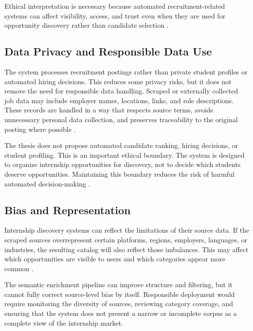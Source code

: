 Ethical interpretation is necessary because automated recruitment-related systems can affect visibility, access, and trust even when they are used for opportunity discovery rather than candidate selection \cite{hunkenschroer2022ethics, rigotti2024fairness}.

\subsection{Data Privacy and Responsible Data Use}

The system processes recruitment postings rather than private student profiles or automated
hiring decisions. This reduces some privacy risks, but it does not remove the need for
responsible data handling. Scraped or externally collected job data may include employer
names, locations, links, and role descriptions. These records are handled in a way that
respects source terms, avoids unnecessary personal data collection, and preserves traceability
to the original posting where possible \cite{hunkenschroer2022ethics, rigotti2024fairness}.

The thesis does not propose automated candidate ranking, hiring decisions, or student
profiling. This is an important ethical boundary. The system is designed to organize
internship opportunities for discovery, not to decide which students deserve opportunities.
Maintaining this boundary reduces the risk of harmful automated decision-making \cite{hunkenschroer2022ethics}.

\subsection{Bias and Representation}

Internship discovery systems can reflect the limitations of their source data. If the scraped
sources overrepresent certain platforms, regions, employers, languages, or industries, the
resulting catalog will also reflect those imbalances. This may affect which opportunities are
visible to users and which categories appear more common \cite{hunkenschroer2022ethics, rigotti2024fairness}.

The semantic enrichment pipeline can improve structure and filtering, but it cannot fully
correct source-level bias by itself. Responsible deployment would require monitoring the
diversity of sources, reviewing category coverage, and ensuring that the system does not
present a narrow or incomplete corpus as a complete view of the internship market.

